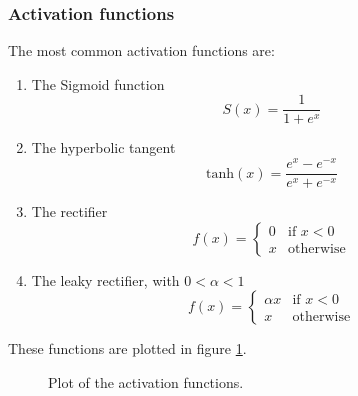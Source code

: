 \documentclass[12pt,a4paper,twoside,openright]{report}
\newlength\figureheight
\newlength\figurewidth
\begin{document}
\subsubsection{Activation functions}
The most common activation functions are:
\begin{enumerate}
\item The Sigmoid function
\begin{equation}
S(x) = \frac{1}{1 + e^x} 
\end{equation}
\item The hyperbolic tangent
\begin{equation}
	\textrm{tanh}(x)=\frac{e^x - e^{-x}}{e^x + e^{-x}}
\end{equation}
\item The rectifier
\begin{equation}
\label{eq:linear_rectifier}
	f(x) = 
\begin{cases}
	0 & \text{if } x < 0\\
	x & \text{otherwise}
\end{cases}
\end{equation}
\item The leaky rectifier, with $0 < \alpha < 1$
\begin{equation}
f(x) = 
\begin{cases}
	\alpha x & \text{if } x < 0\\
	x & \text{otherwise}
\end{cases}
\end{equation}
\end{enumerate}
These functions are plotted in figure \ref{fig:activation_functions}. 
\begin{figure}[h]
	\centering 
	\setlength\figureheight{10cm}
	\setlength{}
	
	\caption{Plot of the activation functions.}
	\label{fig:activation_functions}
\end{figure}
\end{document}
